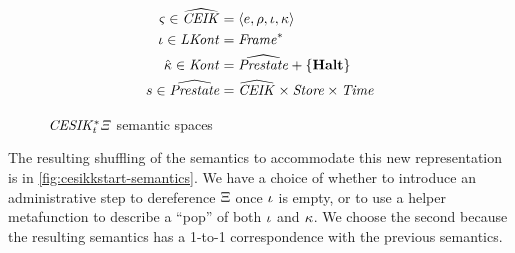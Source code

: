\begin{figure}
  \centering
  \begin{align*}
    \varsigma \in \widehat{\mathit{CEIK}} &= \langle e,\rho,\iota,\kappa \rangle \\
    \iota \in \mathit{LKont} &= \mathit{Frame}^* \\
    \hat{\kappa} \in \mathit{Kont} &= \widehat{\mathit{Prestate}} + \{ \mathbf{Halt} \} \\
    s \in \widehat{\mathit{Prestate}} &= \widehat{\mathit{CEIK}} \times \mathit{Store} \times \mathit{Time} \\
  \end{align*}
  \caption{$\mathit{CESIK^*_t\Xi}$ semantic spaces}
  \label{fig:pushdown-spaces}
\end{figure}

The resulting shuffling of the semantics to accommodate this new representation is in \autoref{fig:cesikkstart-semantics}.
%
We have a choice of whether to introduce an administrative step to dereference $\Xi$ once $\iota$ is empty, or to use a helper metafunction to describe a ``pop'' of both $\iota$ and $\kappa$.
%
We choose the second because the resulting semantics has a 1-to-1 correspondence with the previous semantics.
